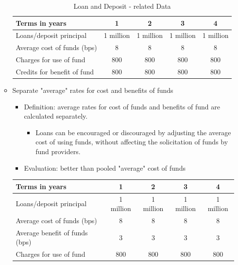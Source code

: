 \begin{itemize}
\begin{itemize}
            \begin{table}[htbp]
                \centering
                \begin{tabular}{@{}lcccc@{}}
                \toprule
                Terms in years & 1 & 2 & 3 & 4 \\
                \midrule
                Loans/deposit principal & 1 million & 1 million & 1 million & 1 million \\
                Average cost of funds (bps) & 8 & 8 & 8 & 8 \\
                Charges for use of fund & 800 & 800 & 800 & 800 \\
                Credits for benefit of fund & 800 & 800 & 800 & 800 \\
                \bottomrule
                \end{tabular}
                \caption{Loan and Deposit - related Data}
                \label{tab:loan_deposit_data}
            \end{table}
    \item Separate "average" rates for cost and benefits of funds
        \begin{itemize}
        \item  Definition: average rates for cost of funds and benefits of fund are calculated separately.
            \begin{itemize}
            \item Loans can be encouraged or discouraged by adjusting  the average cost of using funds, without affecting the solicitation of funds by fund providers.
            \end{itemize}
        \item Evaluation: better than pooled "average" cost of funds
        \end{itemize}
        \begin{table}[htbp]
            \centering
            \begin{tabular}{@{}lcccc@{}}
            \toprule
            Terms in years & 1 & 2 & 3 & 4 \\
            \midrule
            Loans/deposit principal & 1 million & 1 million & 1 million & 1 million \\
            Average cost of funds (bps) & 8 & 8 & 8 & 8 \\
            Average benefit of funds (bps) & 3 & 3 & 3 & 3 \\
            Charges for use of fund & 800 & 800 & 800 & 800 \\

\end{tabular}
\end{table}
\end{itemize}
\end{itemize}
